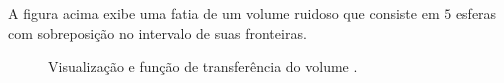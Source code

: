 	A figura acima exibe uma fatia de um volume ruidoso que consiste em $ 5 $ esferas com sobreposição no intervalo de suas fronteiras.

\begin{figure}[t]
	\centering
	\caption{Visualização e função de transferência do volume .}
	\label{fig:r_3sphere}
\end{figure}

